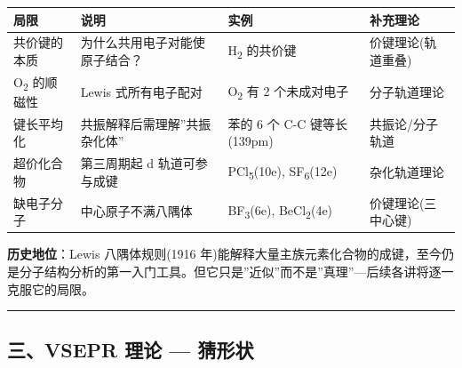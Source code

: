 \documentclass[a4paper,11pt]{ctexart}
\newcounter{none}
\newcommand{\箭}{\ensuremath{\rightarrow}}
\newcommand{\左箭}{\ensuremath{\leftarrow}}
\newcommand{\上箭}{\ensuremath{\uparrow}}
\newcommand{\下箭}{\ensuremath{\downarrow}}
\newcommand{\衡}{\ensuremath{\rightleftharpoons}}
\newcommand{\双箭}{\ensuremath{\leftrightarrow}}
\newcommand{\约等于}{\ensuremath{\approx}}
\newcommand{\小于等于}{\ensuremath{\leq}}
\newcommand{\大于等于}{\ensuremath{\geq}}
\newcommand{\不等于}{\ensuremath{\neq}}
\newcommand{\西格马}{\ensuremath{\sigma}}
\newcommand{\派}{\ensuremath{\pi}}
\begin{document}
{\def\LTcaptype{none} %
\begin{longtable}[]{@{}
  >{\raggedright\arraybackslash}p{}
  >{\raggedright\arraybackslash}p{}
  >{\raggedright\arraybackslash}p{}
  >{\centering\arraybackslash}p{}@{}}
\toprule\noalign{}
\begin{minipage}[b]{\linewidth}\raggedright
局限
\end{minipage} & \begin{minipage}[b]{\linewidth}\raggedright
说明
\end{minipage} & \begin{minipage}[b]{\linewidth}\raggedright
实例
\end{minipage} & \begin{minipage}[b]{\linewidth}\centering
补充理论
\end{minipage} \\
\midrule\noalign{}
\endhead
\bottomrule\noalign{}
\endlastfoot
共价键的本质 & 为什么共用电子对能使原子结合？ & H\textsubscript{2} 的共价键 & 价键理论(轨道重叠) \\
O\textsubscript{2} 的顺磁性 & Lewis 式所有电子配对 & O\textsubscript{2} 有 2 个未成对电子 & 分子轨道理论 \\
键长平均化 & 共振解释后需理解''共振杂化体'' & 苯的 6 个 C-C 键等长(139pm) & 共振论/分子轨道 \\
超价化合物 & 第三周期起 d 轨道可参与成键 & PCl\textsubscript{5}(10e), SF\textsubscript{6}(12e) & 杂化轨道理论 \\
缺电子分子 & 中心原子不满八隅体 & BF\textsubscript{3}(6e), BeCl\textsubscript{2}(4e) & 价键理论(三中心键) \\
\end{longtable}
}

\textbf{历史地位}：Lewis 八隅体规则(1916 年)能解释大量主族元素化合物的成键，至今仍是分子结构分析的第一入门工具。但它只是''近似''而不是''真理''---后续各讲将逐一克服它的局限。

\begin{center}\rule{0.5\linewidth}{0.5pt}\end{center}

\subsection{三、VSEPR 理论 --- 猜形状}\label{ux4e09vsepr-ux7406ux8bba-ux731cux5f62ux72b6}
\end{document}
